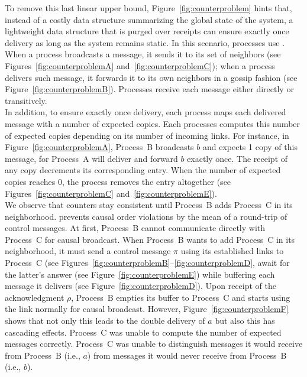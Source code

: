 
To remove this last linear upper bound, Figure~\ref{fig:counterproblem} hints
that, instead of a costly data structure summarizing the global state of the
system, a lightweight data structure that is purged over receipts can ensure
exactly once delivery as long as the system remains static. In this scenario,
processes use \PCBROADCAST. When a process broadcasts a message, it sends it to
its set of neighbors (see Figures~\ref{fig:counterproblemA}
and~\ref{fig:counterproblemC}); when a process delivers such message, it
forwards it to its own neighbors in a gossip fashion (see
Figure~\ref{fig:counterproblemB}). Processes receive each message either
directly or transitively.\\
In addition, to ensure exactly once delivery, each process maps each delivered
message with a number of expected copies. Each processes computes this number of
expected copies depending on its number of incoming links. For instance, in
Figure~\ref{fig:counterproblemA}, Process~B broadcasts $b$ and expects 1 copy of
this message, for Process~A will deliver and forward $b$ exactly once. The
receipt of any copy decrements its corresponding entry.  When the number of
expected copies reaches 0, the process removes the entry altogether (see
Figures~\ref{fig:counterproblemC} and~\ref{fig:counterproblemE}).\\ We observe
that counters stay consistent until Process~B adds Process~C in its
neighborhood. \PCBROADCAST prevents causal order violations by the mean of a
round-trip of control messages.  At first, Process~B cannot communicate directly
with Process~C for causal broadcast. When Process~B wants to add Process~C in
its neighborhood, it must send a control message $\pi$ using its established
links to Process~C (see
Figures~\ref{fig:counterproblemB}--\ref{fig:counterproblemD}, await for the
latter's answer (see Figure~\ref{fig:counterproblemE}) while buffering each
message it delivers (see Figure~\ref{fig:counterproblemD}). Upon receipt of the
acknowledgment $\rho$, Process~B empties its buffer to Process~C and starts
using the link normally for causal broadcast. However,
Figure~\ref{fig:counterproblemF} shows that not only this leads to the double
delivery of $a$ but also this has cascading effects. Process~C was unable to
compute the number of expected messages correctly. Process~C was unable to
distinguish messages it would receive from Process~B (i.e., $a$) from messages
it would never receive from Process~B (i.e., $b$).

